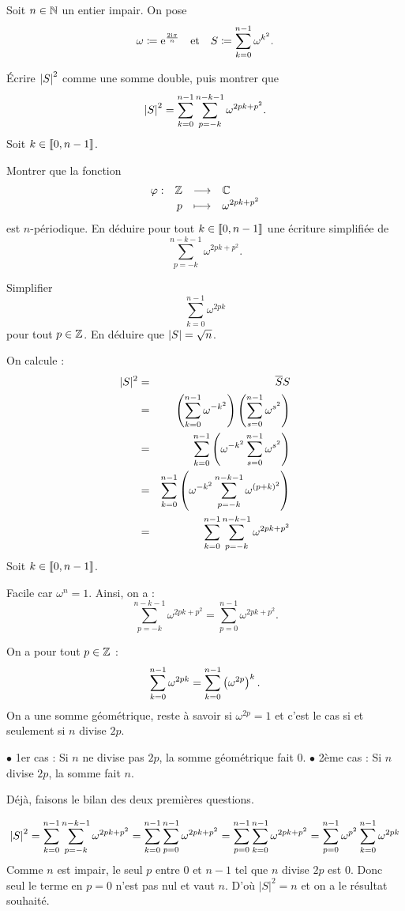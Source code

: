 \documentclass{magnolia}
\begin{document}
Soit $n\in\mathbb{N}$ un entier impair. On pose
\[\omega\coloneqq{\rm e}^{\frac{2{\rm i}\pi}{n}} \quad\text{et}\quad S\coloneqq \sum_{k=0}^{n-1} \omega^{k^2}.\]
\begin{questions}
\question Écrire $\left|S\right|^2$ comme une somme double, puis montrer que
  \[\left|S\right|^2=\sum_{k=0}^{n-1}\sum_{p=-k}^{n-k-1} \omega^{2pk+p^2}.\]
\question Soit $k\in\left\llbracket 0,n-1\right\rrbracket$.
  \begin{questions}
  \question Montrer que la fonction
  \[\begin{array}[t]{lrcl} \displaystyle{\varphi} : & \displaystyle{\mathbb{Z}} & \longrightarrow & \displaystyle{\mathbb{C}} \\ & \displaystyle{p} & \longmapsto & \displaystyle{\omega^{2pk+p^2}} \end{array}\]
  est $n$-périodique.
  \question En déduire pour tout $k\in\left\llbracket 0,n-1\right\rrbracket$ une écriture simplifiée de
  \[\sum_{p=-k}^{n-k-1} \omega^{2pk+p^2}.\]
  \end{questions}
\question Simplifier
  \[\sum_{k=0}^{n-1} \omega^{2pk}\]
  pour tout $p\in\mathbb{Z}$.
\question En déduire que $\left|S\right|=\sqrt{n}$.
\end{questions}

\begin{sol}
\begin{questions}
\question 
On calcule :
\begin{eqnarray*}
|S|^2&=& \overline{S}S\\
&=& \left(\sum_{k=0}^{n-1} \omega^{-k^2}\right)\left(\sum_{s=0}^{n-1} \omega^{s^2}\right)\\
&=& \sum_{k=0}^{n-1}\left(\omega^{-k^2}\sum_{s=0}^{n-1} \omega^{s^2}\right)\\
&=& \sum_{k=0}^{n-1}\left(\omega^{-k^2}\sum_{p=-k}^{n-k-1} \omega^{(p+k)^2}\right)\\
&=& \sum_{k=0}^{n-1}\sum_{p=-k}^{n-k-1} \omega^{2pk+p^2}
\end{eqnarray*}
\question Soit $k\in\left\llbracket 0,n-1\right\rrbracket$.
  \begin{questions}
  \question Facile car $\omega^n=1$.
  \question Ainsi, on a :
  \[\sum_{p=-k}^{n-k-1} \omega^{2pk+p^2}=\sum_{p=0}^{n-1} \omega^{2pk+p^2}.\]
  \end{questions}
\question On a pour tout $p\in\mathbb{Z}$ :
  \[\sum_{k=0}^{n-1} \omega^{2pk}=\sum_{k=0}^{n-1}\left(\omega^{2p}\right)^k.\]
  On a une somme géométrique, reste à savoir si $\omega^{2p}=1$ et c'est le cas si et seulement si $n$ divise $2p$.
  
  $\bullet$ 1er cas : Si $n$ ne divise pas $2p$, la somme géométrique fait $0$.
   $\bullet$ 2ème cas : Si $n$ divise $2p$, la somme fait $n$.
 
\question Déjà, faisons le bilan des deux premières questions. 


\[\left|S\right|^2=\sum_{k=0}^{n-1}\sum_{p=-k}^{n-k-1} \omega^{2pk+p^2}=\sum_{k=0}^{n-1}\sum_{p=0}^{n-1} \omega^{2pk+p^2}=\sum_{p=0}^{n-1}\sum_{k=0}^{n-1}\omega^{2pk+p^2}=\sum_{p=0}^{n-1}\omega^{p^2}\sum_{k=0}^{n-1}\omega^{2pk}\]
Comme $n$ est impair, le seul $p$ entre $0$ et $n-1$ tel que $n$ divise $2p$ est $0$. Donc seul le terme en $p=0$ n'est pas nul et vaut $n$. D'où $|S|^2=n$ et on a le résultat souhaité.

\end{questions}
\end{sol}
\end{document}
